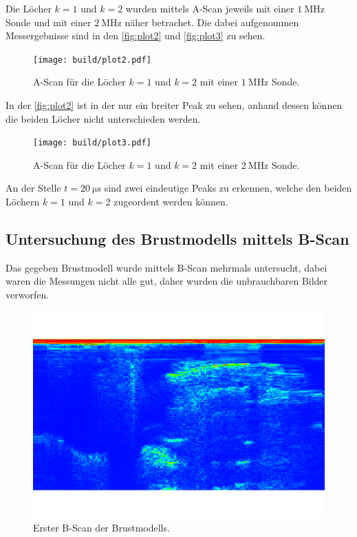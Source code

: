 Die Löcher $k = 1$ und $k = 2$ wurden mittels A-Scan jeweils mit einer $\SI{1}{\mega\hertz}$ Sonde und mit einer
$\SI{2}{\mega\hertz}$ näher betrachet. Die dabei aufgenommen Messergebnisse sind in den \autoref{fig:plot2} und \autoref{fig:plot3}
zu sehen.

\begin{figure}[H]
	\texttt{[image: build/plot2.pdf]}
	\captionsetup{width=0.765\linewidth}
	\caption{A-Scan für die Löcher $k = 1$ und $k = 2$ mit einer $\SI{1}{\mega\hertz}$ Sonde.}
	\label{fig:plot2}
\end{figure}
In der \autoref{fig:plot2} ist in der nur ein breiter Peak zu sehen, anhand dessen können die beiden Löcher nicht unterschieden werden.

\begin{figure}[H]
	\texttt{[image: build/plot3.pdf]}
	\captionsetup{width=0.765\linewidth}
	\caption{A-Scan für die Löcher $k = 1$ und $k = 2$ mit einer $\SI{2}{\mega\hertz}$ Sonde.}
	\label{fig:plot3}
\end{figure}
An der Stelle $t = \SI{20}{\micro\second}$ sind zwei eindeutige Peaks zu erkennen, welche den beiden Löchern $k = 1$ und $k = 2$
zugeordent werden können.

\subsection{Untersuchung des Brustmodells mittels B-Scan}
\label{sec:Untersuchung des Brustmodells mittels B-Scan}

Das gegeben Brustmodell wurde mittels B-Scan mehrmals untersucht, dabei waren die Messungen nicht alle gut, daher wurden 
die unbrauchbaren Bilder verworfen.

\begin{figure}[H]
    \centering
	\includegraphics[width=0.8\linewidth]{content/grafik/Tumor_2.pdf}
    \captionsetup{width=0.765\linewidth}
	\caption{Erster B-Scan der Brustmodells.}
	\label{fig:b1}
\end{figure}

